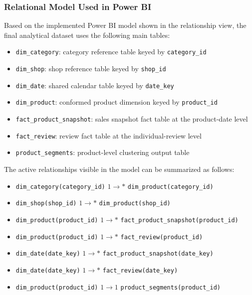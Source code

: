         \subsubsection{Relational Model Used in Power BI}
        Based on the implemented Power BI model shown in the relationship view, the final analytical dataset uses the following main tables:

        \begin{itemize}
            \item \texttt{dim\_category}: category reference table keyed by \texttt{category\_id}
            \item \texttt{dim\_shop}: shop reference table keyed by \texttt{shop\_id}
            \item \texttt{dim\_date}: shared calendar table keyed by \texttt{date\_key}
            \item \texttt{dim\_product}: conformed product dimension keyed by \texttt{product\_id}
            \item \texttt{fact\_product\_snapshot}: sales snapshot fact table at the product-date level
            \item \texttt{fact\_review}: review fact table at the individual-review level
            \item \texttt{product\_segments}: product-level clustering output table
        \end{itemize}

        The active relationships visible in the model can be summarized as follows:

        \begin{itemize}
            \item \texttt{dim\_category(category\_id)} $1 \rightarrow *$ \texttt{dim\_product(category\_id)}
            \item \texttt{dim\_shop(shop\_id)} $1 \rightarrow *$ \texttt{dim\_product(shop\_id)}
            \item \texttt{dim\_product(product\_id)} $1 \rightarrow *$ \texttt{fact\_product\_snapshot(product\_id)}
            \item \texttt{dim\_product(product\_id)} $1 \rightarrow *$ \texttt{fact\_review(product\_id)}
            \item \texttt{dim\_date(date\_key)} $1 \rightarrow *$ \texttt{fact\_product\_snapshot(date\_key)}
            \item \texttt{dim\_date(date\_key)} $1 \rightarrow *$ \texttt{fact\_review(date\_key)}
            \item \texttt{dim\_product(product\_id)} $1 \rightarrow 1$ \texttt{product\_segments(product\_id)}
        \end{itemize}

